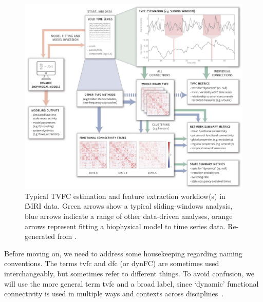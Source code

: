 \begin{figure}[t]
  \centering
  \includegraphics[width=\textwidth]{fig/tvfc_methods_Lurie2020_compressed}
  \caption{
    Typical TVFC estimation and feature extraction workflow(s) in fMRI data.
    Green arrows show a typical sliding-windows analysis, blue arrows indicate a range of other data-driven analyses, orange arrows represent fitting a biophysical model to time series data.
    Re-generated from \textcite{Lurie2020}.
  }\label{fig:tvfc-workflow}
\end{figure}


Before moving on, we need to address some housekeeping regarding naming conventions.
The terms \gls{tvfc} and \gls{dfc} (or dynFC) are sometimes used interchangeably, but sometimes refer to different things.
To avoid confusion, we will use the more general term \gls{tvfc} and a broad label, since `dynamic' functional connectivity is used in multiple ways and contexts across disciplines~\parencite[see][for more details]{Lurie2020}.

